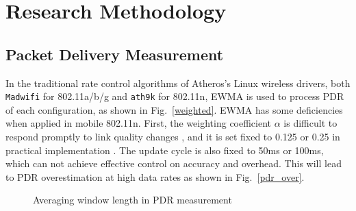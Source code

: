 \documentclass[draftclsnofoot,journal,onecolumn,11pt]{IEEEtran}
\begin{document}
\section{Research Methodology}

\subsection{Packet Delivery Measurement} \label{sect:methodology}

In the traditional rate control algorithms of Atheros's Linux wireless drivers, both \texttt{Madwifi} for 802.11a/b/g and \texttt{ath9k} \cite{ath9k} for 802.11n, EWMA is used to process PDR of each configuration, as shown in Fig.~\ref{weighted}. EWMA has some deficiencies when applied in mobile 802.11n. First, the weighting coefficient $\alpha$ is difficult to respond promptly to link quality changes \cite{EWMAChart}, and it is set fixed to 0.125 or 0.25 in practical implementation \cite{ath9k} \cite{minstrel}. The update cycle is also fixed to 50ms or 100ms, which can not achieve effective control on accuracy and overhead. This will lead to PDR overestimation at high data rates as shown in Fig.~\ref{pdr_over}.

\begin{figure}[!t]
\centerline{
}
\caption{Averaging window length in PDR measurement}
\label{method}
\end{figure}
\end{document}
